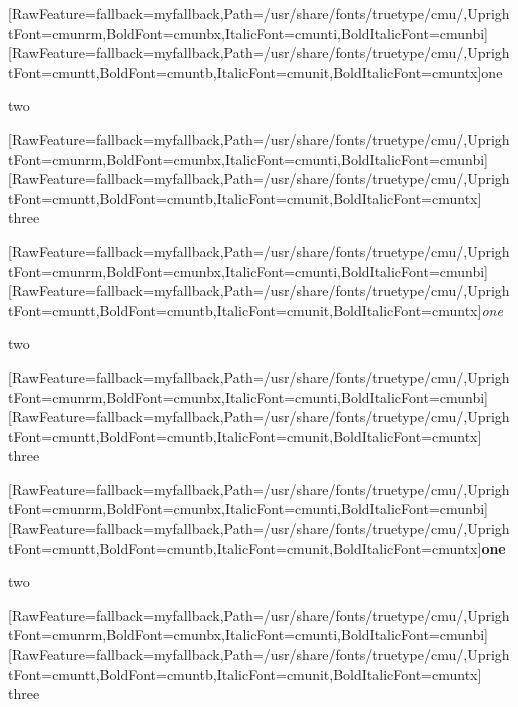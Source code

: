 \label{0}


{\ttfamily \begin{myitemize}
\item{} \allowbreak{}\setmainfont{cmuntt.ttf}[RawFeature={fallback=myfallback},Path=/usr/share/fonts/truetype/cmu/,UprightFont=cmunrm,BoldFont=cmunbx,ItalicFont=cmunti,BoldItalicFont=cmunbi]\setmonofont{cmuntt.ttf}[RawFeature={fallback=myfallback},Path=/usr/share/fonts/truetype/cmu/,UprightFont=cmuntt,BoldFont=cmuntb,ItalicFont=cmunit,BoldItalicFont=cmuntx]\ttfamily one
\item{} two
\end{myitemize}}\allowbreak{}\setmainfont{cmunrm.ttf}[RawFeature={fallback=myfallback},Path=/usr/share/fonts/truetype/cmu/,UprightFont=cmunrm,BoldFont=cmunbx,ItalicFont=cmunti,BoldItalicFont=cmunbi]\setmonofont{cmunrm.ttf}[RawFeature={fallback=myfallback},Path=/usr/share/fonts/truetype/cmu/,UprightFont=cmuntt,BoldFont=cmuntb,ItalicFont=cmunit,BoldItalicFont=cmuntx]
three
{\itshape \begin{myitemize}
\item{} \allowbreak{}\setmainfont{cmunti.ttf}[RawFeature={fallback=myfallback},Path=/usr/share/fonts/truetype/cmu/,UprightFont=cmunrm,BoldFont=cmunbx,ItalicFont=cmunti,BoldItalicFont=cmunbi]\setmonofont{cmunti.ttf}[RawFeature={fallback=myfallback},Path=/usr/share/fonts/truetype/cmu/,UprightFont=cmuntt,BoldFont=cmuntb,ItalicFont=cmunit,BoldItalicFont=cmuntx]\itshape one
\item{} two
\end{myitemize}}\allowbreak{}\setmainfont{cmunrm.ttf}[RawFeature={fallback=myfallback},Path=/usr/share/fonts/truetype/cmu/,UprightFont=cmunrm,BoldFont=cmunbx,ItalicFont=cmunti,BoldItalicFont=cmunbi]\setmonofont{cmunrm.ttf}[RawFeature={fallback=myfallback},Path=/usr/share/fonts/truetype/cmu/,UprightFont=cmuntt,BoldFont=cmuntb,ItalicFont=cmunit,BoldItalicFont=cmuntx]
three

{\bfseries \begin{myitemize}
\item{} \allowbreak{}\setmainfont{cmunbx.ttf}[RawFeature={fallback=myfallback},Path=/usr/share/fonts/truetype/cmu/,UprightFont=cmunrm,BoldFont=cmunbx,ItalicFont=cmunti,BoldItalicFont=cmunbi]\setmonofont{cmunbx.ttf}[RawFeature={fallback=myfallback},Path=/usr/share/fonts/truetype/cmu/,UprightFont=cmuntt,BoldFont=cmuntb,ItalicFont=cmunit,BoldItalicFont=cmuntx]\bfseries one
\item{} two
\end{myitemize}}\allowbreak{}\setmainfont{cmunrm.ttf}[RawFeature={fallback=myfallback},Path=/usr/share/fonts/truetype/cmu/,UprightFont=cmunrm,BoldFont=cmunbx,ItalicFont=cmunti,BoldItalicFont=cmunbi]\setmonofont{cmunrm.ttf}[RawFeature={fallback=myfallback},Path=/usr/share/fonts/truetype/cmu/,UprightFont=cmuntt,BoldFont=cmuntb,ItalicFont=cmunit,BoldItalicFont=cmuntx]
three

